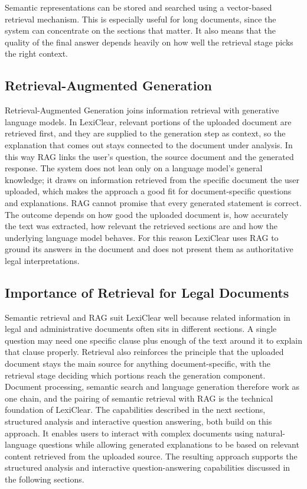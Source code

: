 \documentclass[12pt,a4paper,oneside]{report}
\begin{document}
Semantic representations can be stored and searched using a vector-based
retrieval mechanism. This is especially useful for long documents, since the system can concentrate on the sections that matter. It also means that the quality of the final answer depends heavily on how well the retrieval stage picks the right context.

\subsection{Retrieval-Augmented Generation}

Retrieval-Augmented Generation joins information retrieval with generative language models. In LexiClear, relevant portions of the uploaded document are retrieved first, and they are supplied to the generation step as context, so the explanation that comes out stays connected to the document under analysis. In this way RAG links the user's question, the source document and the generated response. The system does not lean only on a language model's general knowledge; it draws on information retrieved from the specific document the user uploaded, which makes the approach a good fit for document-specific questions and explanations.    RAG cannot promise that every generated statement is correct. The outcome depends on how good the uploaded document is, how accurately the text was extracted, how relevant the retrieved sections are and how the underlying language model behaves. For this reason LexiClear uses RAG to ground its answers in the document and does not present them as authoritative legal interpretations.

\subsection{Importance of Retrieval for Legal Documents}

Semantic retrieval and RAG suit LexiClear well because related information in legal and administrative documents often sits in different sections. A single question may need one specific clause plus enough of the text around it to explain that clause properly. Retrieval also reinforces the principle that the uploaded document stays the main source for anything document-specific, with the retrieval stage deciding which portions reach the generation component. Document processing, semantic search and language generation therefore work as one chain, and the pairing of semantic retrieval with RAG is the technical foundation of LexiClear.  The capabilities described in the next sections, structured analysis and interactive question answering, both build on this approach. It enables users to interact with complex
documents using natural-language questions while allowing generated
explanations to be based on relevant content retrieved from the uploaded
source. The resulting approach supports the structured analysis and
interactive question-answering capabilities discussed in the following
sections.
\end{document}
